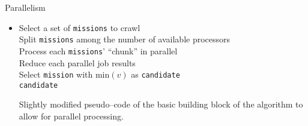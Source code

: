 \begin{frame}{Parallelism}
    \begin{itemize}
        \item[\xspace]
            \begin{algorithm}[H]
                \SetAlgoLined
                    \FMain{} {
                         {
                            Select a set of \texttt{missions} to crawl \\
                            Split \texttt{missions} among the number of available processors \\
                            Process each \texttt{missions}' ``chunk'' in parallel \\
                            Reduce each parallel job results \\
                            Select \texttt{mission} with $\text{min}(v)$ as \texttt{candidate} \\
                            \Return \texttt{candidate}
                        }
                    }
                \caption{Slightly modified pseudo--code of the basic \newline 
                building block of the \mlblink algorithm to allow for \newline
                parallel processing.}
                \label{pscode:ml-blink:parallel}
            \end{algorithm}
    \end{itemize}
\end{frame}
